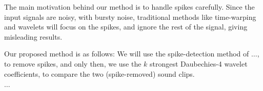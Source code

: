 The main motivation behind our method
is to handle spikes carefully.
Since the input signals are noisy, with bursty noise,
traditional methods like time-warping and wavelets
will focus on the spikes, and ignore the rest of the signal,
giving misleading results.

Our proposed method is as follows: 
We will use the spike-detection method of $\ldots$,
to remove spikes, and only then,  we use the $k$ strongest
Daubechies-4 wavelet coefficients, to compare the two (spike-removed)
sound clips.

$\ldots$

